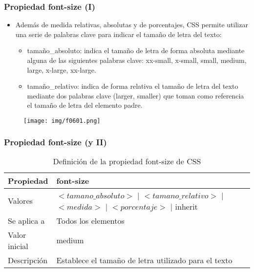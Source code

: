 \begin{frame}
\frametitle{Propiedad font-size (I)}

\begin{itemize}
  \item Además de medida relativas, absolutas y de porcentajes, CSS permite utilizar una serie de palabras clave para indicar el tamaño de letra del texto:
  \begin{itemize}
    \item tamaño\_absoluto: indica el tamaño de letra de forma absoluta mediante alguna de las siguientes palabras clave: xx-small, x-small, small, medium, large, x-large, xx-large.
    \item tamaño\_relativo: indica de forma relativa el tamaño de letra del texto mediante dos palabras clave (larger, smaller) que toman como referencia el tamaño de letra del elemento padre.
  \end{itemize}
\end{itemize}


\begin{center}
\begin{figure}[p]
\texttt{[image: img/f0601.png]}
\end{figure}
\end{center}

\end{frame}



\begin{frame}
\frametitle{Propiedad font-size (y II)}

\begin{center}
  \begin{table}
   \begin{tabular}{p{1.8cm}p{7.8cm}}
Propiedad & \bf{font-size} \\ \hline
Valores & $<tamano\_absoluto>$ | $<tamano\_relativo>$ | $<medida>$ | $<porcentaje>$ | inherit \\ \hline
Se aplica a & Todos los elementos \\ \hline
Valor inicial & medium \\ \hline
Descripción & Establece el tamaño de letra utilizado para el texto \\ \hline
  \end{tabular}
   \caption{Definición de la propiedad font-size de CSS}
 \end{table}
\end{center}

\end{frame}


